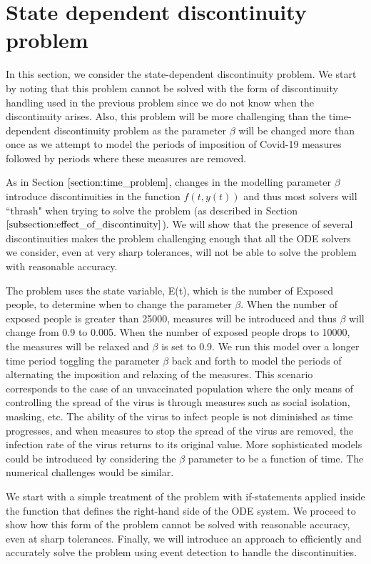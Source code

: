 
\section{State dependent discontinuity problem}
In this section, we consider the state-dependent discontinuity problem. We start by noting that this problem cannot be solved with the form of discontinuity handling used in the previous problem since we do not know when the discontinuity arises. Also, this problem will be more challenging than the time-dependent discontinuity problem as the parameter $\beta$ will be changed more than once as we attempt to model the periods of imposition of Covid-19 measures followed by periods where these measures are removed. 

As in Section $\ref{section:time_problem}$, changes in the modelling parameter $\beta$ introduce discontinuities in the function $f(t, y(t))$ and thus most solvers will ``thrash" when trying to solve the problem (as described in Section $\ref{subsection:effect_of_discontinuity}$). We will show that the presence of several discontinuities makes the problem challenging enough that all the ODE solvers we consider, even at very sharp tolerances, will not be able to solve the problem with reasonable accuracy.

The problem uses the state variable, E(t), which is the number of Exposed people, to determine when to change the parameter $\beta$. When the number of exposed people is greater than 25000, measures will be introduced and thus $\beta$ will change from 0.9 to 0.005. When the number of exposed people drops to 10000, the measures will be relaxed and $\beta$ is set to 0.9. We run this model over a longer time period toggling the parameter $\beta$ back and forth to model the periods of alternating the imposition and relaxing of the measures. This scenario corresponds to the case of an unvaccinated population where the only means of controlling the spread of the virus is through measures such as social isolation, masking, etc. The ability of the virus to infect people is not diminished as time progresses, and when measures to stop the spread of the virus are removed, the infection rate of the virus returns to its original value. More sophisticated models could be introduced by considering the $\beta$ parameter to be a function of time. The numerical challenges would be similar.

We start with a simple treatment of the problem with if-statements applied inside the function that defines the right-hand side of the ODE system. We proceed to show how this form of the problem cannot be solved with reasonable accuracy, even at sharp tolerances. Finally, we will introduce an approach to efficiently and accurately solve the problem using event detection to handle the discontinuities.

